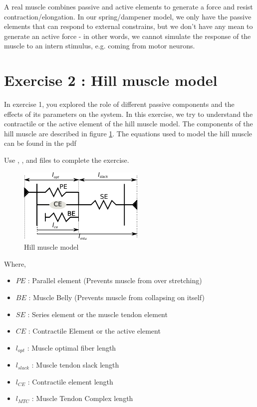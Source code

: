 \documentclass{cmc}
\begin{document}
A real muscle combines passive and active elements to generate a force and resist contraction/elongation. In our spring/dampener model, we only have the passive elements that can respond to external constrains, but we don't have any mean to generate an active force - in other words, we cannot simulate the response of the muscle to an intern stimulus, e.g. coming from motor neurons.

\newpage
\section*{Exercise 2 : Hill muscle model}
\label{sec:question-2}

In exercise 1, you explored the role of different passive components
and the effects of its parameters on the system. In this exercise, we
try to understand the contractile or the active element of the hill
muscle model. The components of the hill muscle are described in
figure \ref{fig:hill_muscle}. The equations used to model the hill
muscle can be found in the pdf 


Use , ,
 and  files to
complete the exercise.

\begin{figure}[H]
  \centering \includegraphics[scale=2.5]{figures/hill_muscle}
  \caption{Hill muscle model}
  \label{fig:hill_muscle}
\end{figure}

Where,

\begin{itemize}
\item $PE$ : Parallel element (Prevents muscle from over stretching)
\item $BE$ : Muscle Belly (Prevents muscle from collapsing on itself)
\item $SE$ : Series element or the muscle tendon element
\item $CE$ : Contractile Element or the active element
\item $l_{opt}$ : Muscle optimal fiber length
\item $l_{slack}$ : Muscle tendon slack length
\item $l_{CE}$ : Contractile element length
\item $l_{MTC}$ : Muscle Tendon Complex length
\end{itemize}
\end{document}
